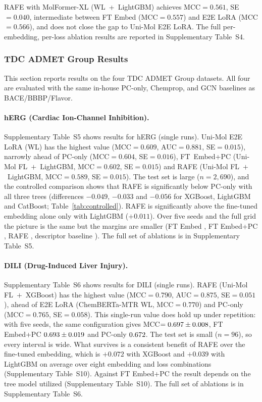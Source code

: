 \documentclass[pdflatex,sn-mathphys-num,Numbered]{sn-jnl}%
\begin{document}
RAFE with MolFormer-XL (WL~+~LightGBM) achieves MCC$=0.561$, SE$=0.040$, intermediate between FT Embed (MCC$=0.557$) and E2E LoRA (MCC$=0.566$), and does not close the gap to Uni-Mol E2E LoRA. The full per-embedding, per-loss ablation results are reported in Supplementary Table~S4.

\FloatBarrier
\subsubsection{TDC ADMET Group Results}\label{sec:new_datasets}
This section reports results on the four TDC ADMET Group datasets. All four are evaluated with the same in-house PC-only, Chemprop, and GCN baselines as BACE/BBBP/Flavor.

\paragraph{hERG (Cardiac Ion-Channel Inhibition).} Supplementary Table~S5 shows results for hERG (single runs). Uni-Mol E2E LoRA (WL) has the highest value (MCC$=0.609$, AUC$=0.881$, SE$=0.015$), narrowly ahead of PC-only (MCC$=0.604$, SE$=0.016$), FT~Embed+PC (Uni-Mol FL~$+$~LightGBM, MCC$=0.602$, SE$=0.015$) and RAFE (Uni-Mol FL~$+$~LightGBM, MCC$=0.589$, SE$=0.015$). The test set is large ($n=2{,}690$), and the controlled comparison shows that RAFE is significantly below PC-only with all three trees (differences $-0.049$, $-0.033$ and $-0.056$ for XGBoost, LightGBM and CatBoost; Table~\ref{tab:controlled}). RAFE is significantly above the fine-tuned embedding alone only with LightGBM ($+0.011$). Over five seeds and the full grid the picture is the same but the margins are smaller (FT Embed \mHERGFT{}, FT Embed+PC \mHERGFTPC{}, RAFE \mHERGRAFE{}, descriptor baseline \mHERGPC{}). The full set of ablations is in Supplementary Table~S5.

\paragraph{DILI (Drug-Induced Liver Injury).} Supplementary Table~S6 shows results for DILI (single runs). RAFE (Uni-Mol FL~$+$~XGBoost) has the highest value (MCC$=0.790$, AUC$=0.875$, SE$=0.051$), ahead of E2E LoRA (ChemBERTa-MTR WL, MCC$=0.770$) and PC-only (MCC$=0.765$, SE$=0.058$). This single-run value does hold up under repetition: with five seeds, the same configuration gives MCC$=0.697 \pm 0.008$, FT Embed+PC $0.693 \pm 0.019$ and PC-only $0.672$. The test set is small ($n=96$), so every interval is wide. What survives is a consistent benefit of RAFE over the fine-tuned embedding, which is $+0.072$ with XGBoost and $+0.039$ with LightGBM on average over eight embedding and loss combinations (Supplementary Table~S10). Against FT Embed+PC the result depends on the tree model utilized (Supplementary Table~S10). The full set of ablations is in Supplementary Table~S6.
\end{document}
